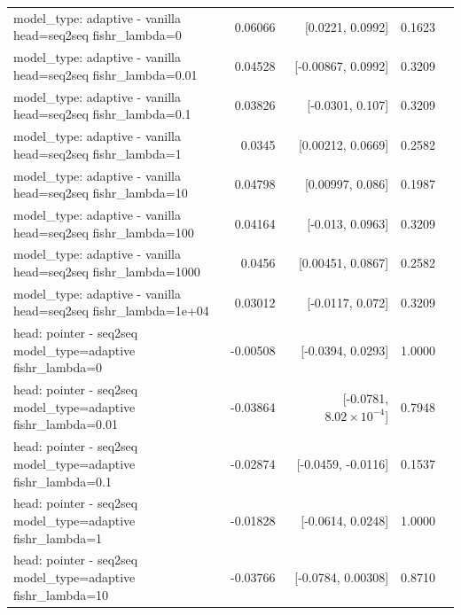 \documentclass[10pt]{article}
\makeatletter
\newcommand{\stackcell}[1]{\begin{tabular}[t]{@{}l@{}}#1\end{tabular}}
\makeatother
\begin{document}
{\begin{longtable}{lrrrl}
\stackcell{model\_type: adaptive - vanilla\\\footnotesize head=seq2seq fishr\_lambda=0 } & 0.06066 & [0.0221, 0.0992] & 0.1623 & \\
\stackcell{model\_type: adaptive - vanilla\\\footnotesize head=seq2seq fishr\_lambda=0.01 } & 0.04528 & [-0.00867, 0.0992] & 0.3209 & \\
\stackcell{model\_type: adaptive - vanilla\\\footnotesize head=seq2seq fishr\_lambda=0.1 } & 0.03826 & [-0.0301, 0.107] & 0.3209 & \\
\stackcell{model\_type: adaptive - vanilla\\\footnotesize head=seq2seq fishr\_lambda=1 } & 0.0345 & [0.00212, 0.0669] & 0.2582 & \\
\stackcell{model\_type: adaptive - vanilla\\\footnotesize head=seq2seq fishr\_lambda=10 } & 0.04798 & [0.00997, 0.086] & 0.1987 & \\
\stackcell{model\_type: adaptive - vanilla\\\footnotesize head=seq2seq fishr\_lambda=100 } & 0.04164 & [-0.013, 0.0963] & 0.3209 & \\
\stackcell{model\_type: adaptive - vanilla\\\footnotesize head=seq2seq fishr\_lambda=1000 } & 0.0456 & [0.00451, 0.0867] & 0.2582 & \\
\stackcell{model\_type: adaptive - vanilla\\\footnotesize head=seq2seq fishr\_lambda=1e+04 } & 0.03012 & [-0.0117, 0.072] & 0.3209 & \\
\stackcell{head: pointer - seq2seq\\\footnotesize model\_type=adaptive fishr\_lambda=0 } & -0.00508 & [-0.0394, 0.0293] & 1.0000 & \\
\stackcell{head: pointer - seq2seq\\\footnotesize model\_type=adaptive fishr\_lambda=0.01 } & -0.03864 & [-0.0781, $8.02\times10^{-4}$] & 0.7948 & \\
\stackcell{head: pointer - seq2seq\\\footnotesize model\_type=adaptive fishr\_lambda=0.1 } & -0.02874 & [-0.0459, -0.0116] & 0.1537 & \\
\stackcell{head: pointer - seq2seq\\\footnotesize model\_type=adaptive fishr\_lambda=1 } & -0.01828 & [-0.0614, 0.0248] & 1.0000 & \\
\stackcell{head: pointer - seq2seq\\\footnotesize model\_type=adaptive fishr\_lambda=10 } & -0.03766 & [-0.0784, 0.00308] & 0.8710 & \\

\end{longtable}}
\end{document}
